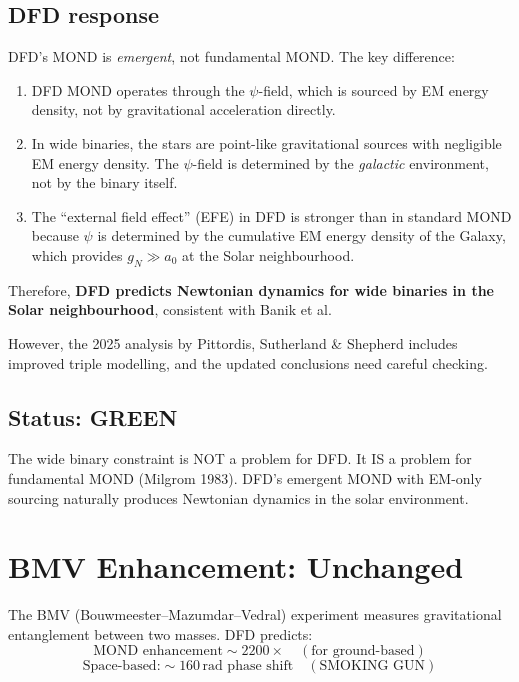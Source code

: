 \documentclass[11pt,a4paper]{article}
\newcommand{\GREEN}{\textcolor{dfdgreen}{\textbf{GREEN}}}
\begin{document}
\subsection{DFD response}

DFD's MOND is \emph{emergent}, not fundamental MOND. The key difference:
\begin{enumerate}
\item DFD MOND operates through the $\psi$-field, which is sourced by EM energy density, not by gravitational acceleration directly.
\item In wide binaries, the stars are point-like gravitational sources with negligible EM energy density. The $\psi$-field is determined by the \emph{galactic} environment, not by the binary itself.
\item The ``external field effect'' (EFE) in DFD is stronger than in standard MOND because $\psi$ is determined by the cumulative EM energy density of the Galaxy, which provides $g_N \gg a_0$ at the Solar neighbourhood.
\end{enumerate}

Therefore, \textbf{DFD predicts Newtonian dynamics for wide binaries in the Solar neighbourhood}, consistent with Banik et al.

However, the 2025 analysis by Pittordis, Sutherland \& Shepherd includes improved triple modelling, and the updated conclusions need careful checking.

\subsection{Status: \GREEN{}}

The wide binary constraint is NOT a problem for DFD. It IS a problem for fundamental MOND (Milgrom 1983). DFD's emergent MOND with EM-only sourcing naturally produces Newtonian dynamics in the solar environment.

\section{BMV Enhancement: Unchanged}

The BMV (Bouwmeester--Mazumdar--Vedral) experiment measures gravitational entanglement between two masses. DFD predicts:
\begin{equation}
\text{MOND enhancement} \sim 2200\times \quad (\text{for ground-based})
\end{equation}
\begin{equation}
\text{Space-based:} \sim 160\,\text{rad phase shift} \quad (\text{SMOKING GUN})
\end{equation}
\end{document}
